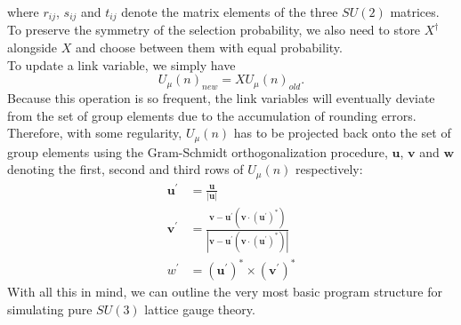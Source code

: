 \documentclass[a4paper,10pt]{article}
\begin{document}
where $r_{ij}$, $s_{ij}$ and $t_{ij}$ denote the matrix elements of the three $SU(2)$ matrices. To preserve the symmetry of the selection probability, we also need to store $X^\dagger$ alongside $X$ and choose between them with equal probability.\\To update a link variable, we simply have
\begin{equation}
U_\mu(n)_{new}= XU_\mu(n)_{old}.
\end{equation}
Because this operation is so frequent, the link variables will eventually deviate from the set of group elements due to the accumulation of rounding errors. Therefore, with some regularity, $U_\mu(n)$ has to be projected back onto the set of group elements using the Gram-Schmidt orthogonalization procedure, $\boldsymbol{u}$, $\boldsymbol{v}$ and $\boldsymbol{w}$ denoting the first, second and third rows of $U_\mu(n)$ respectively:
\begin{equation}
\begin{aligned}
\boldsymbol{u}^\prime &=\frac{\boldsymbol{u}}{|\boldsymbol{u}| }\\
\boldsymbol{v}^\prime &=\frac{\boldsymbol{v}-\boldsymbol{u}^\prime\left(\boldsymbol{v} \cdot (\boldsymbol{u}^\prime)^{*}\right)}{\left|\boldsymbol{v}-\boldsymbol{u}^\prime\left(\boldsymbol{v} \cdot (\boldsymbol{u}^\prime)^{*}\right)\right|}\\ w^\prime &=(\boldsymbol{u}^\prime)^{*}\times(\boldsymbol{v}^\prime)^{*}
\end{aligned}
\end{equation}
With all this in mind, we can outline the very most basic program structure for simulating pure $SU(3)$ lattice gauge theory.
\end{document}
